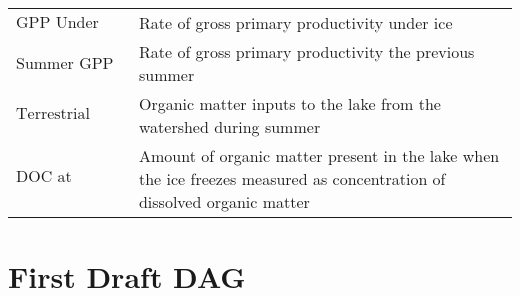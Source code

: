 \documentclass[]{article}
\begin{document}
\begin{longtable}[]{@{}ll@{}}
\begin{minipage}[t]{0.19\columnwidth}\raggedright
\(\text{GPP Under Ice}\)\strut
\end{minipage} & \begin{minipage}[t]{0.75\columnwidth}\raggedright
Rate of gross primary productivity under ice\strut
\end{minipage}\tabularnewline
\begin{minipage}[t]{0.19\columnwidth}\raggedright
\(\text{Summer GPP}\)\strut
\end{minipage} & \begin{minipage}[t]{0.75\columnwidth}\raggedright
Rate of gross primary productivity the previous summer\strut
\end{minipage}\tabularnewline
\begin{minipage}[t]{0.19\columnwidth}\raggedright
\(\text{Terrestrial DOC Inputs}\)\strut
\end{minipage} & \begin{minipage}[t]{0.75\columnwidth}\raggedright
Organic matter inputs to the lake from the watershed during summer\strut
\end{minipage}\tabularnewline
\begin{minipage}[t]{0.19\columnwidth}\raggedright
\(\text{DOC at freezing}\)\strut
\end{minipage} & \begin{minipage}[t]{0.75\columnwidth}\raggedright
Amount of organic matter present in the lake when the ice freezes
measured as concentration of dissolved organic matter\strut
\end{minipage}\tabularnewline
\bottomrule
\end{longtable}

\hypertarget{first-draft-dag}{%
\section{First Draft DAG}\label{first-draft-dag}}
\end{document}
